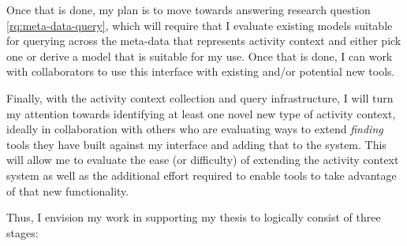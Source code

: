 Once that is done, my plan is to move towards answering research question
\ref{rq:meta-data-query}, which will require that I evaluate existing models
suitable for querying across the meta-data that represents activity context and
either pick one or derive a model that is suitable for my use.  Once that is
done, I can work with collaborators to use this interface with existing and/or
potential new tools.

Finally, with the activity context collection and query infrastructure, I will
turn my attention towards identifying at least one novel new type of activity
context, ideally in collaboration with others who are evaluating ways to extend
\emph{finding} tools they have built against my interface and adding that to the
system.  This will allow me to evaluate the ease (or difficulty) of extending
the activity context system as well as the additional effort required to enable
tools to take advantage of that new functionality.

Thus, I envision my work in supporting my thesis to logically consist of three
stages:

